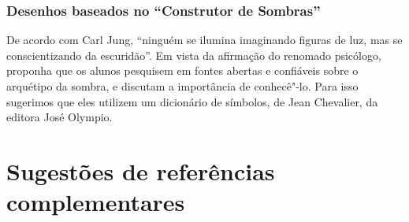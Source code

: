 \documentclass[12pt]{extarticle}
\begin{document}
\subsubsection{Desenhos baseados no ``Construtor de Sombras''}


De acordo com Carl Jung, ``ninguém se ilumina imaginando figuras de
luz, mas se conscientizando da escuridão''. Em vista da afirmação do
renomado psicólogo, proponha que os alunos pesquisem em fontes 
abertas e confiáveis sobre o arquétipo
da sombra, e discutam a importância de conhecê"-lo. 
Para isso sugerimos que eles utilizem um dicionário de símbolos, de 
Jean Chevalier, da editora José Olympio. 



\section{Sugestões de referências complementares}
\end{document}
